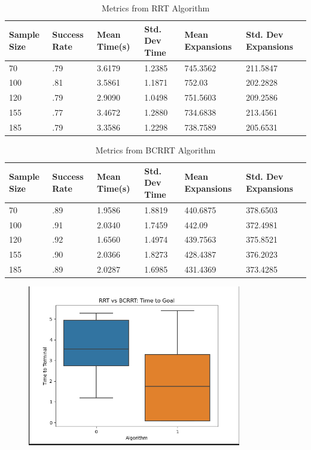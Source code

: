 \documentclass{article}
\begin{document}

\begin{table}
  \caption{Metrics from RRT Algorithm}
  \label{RRT Metrics}
  \centering
  \begin{tabular}{llllll}
    \cmidrule(r){1-6}
   Sample Size    & Success Rate     & Mean Time(s) & Std. Dev Time & Mean Expansions & Std. Dev Expansions\\
    \midrule
    70 & .79 & 3.6179 & 1.2385 & 745.3562 & 211.5847 \\
    100 & .81 & 3.5861 & 1.1871 & 752.03 & 202.2828 \\
    120 & .79 & 2.9090 & 1.0498 & 751.5603 & 209.2586 \\
    155 & .77 & 3.4672 & 1.2880 & 734.6838 & 213.4561 \\
    185 & .79 & 3.3586 & 1.2298 & 738.7589 & 205.6531 \\
    \bottomrule
  \end{tabular}
\end{table}


\begin{table}
  \caption{Metrics from BCRRT Algorithm}
  \label{BCRRT Metrics}
  \centering
  \begin{tabular}{llllll}
    \cmidrule(r){1-6}
   Sample Size    & Success Rate     & Mean Time(s) & Std. Dev Time & Mean Expansions & Std. Dev Expansions\\
    \midrule
    70 & .89 & 1.9586 & 1.8819 & 440.6875 & 378.6503 \\
    100 & .91 & 2.0340 & 1.7459 & 442.09 & 372.4981 \\
    120 & .92 & 1.6560 & 1.4974 & 439.7563 & 375.8521 \\
    155 & .90 & 2.0366 & 1.8273 & 428.4387 & 376.2023 \\
    185 & .89 & 2.0287 & 1.6985 & 431.4369 & 373.4285 \\
    \bottomrule
  \end{tabular}
\end{table}

\begin{figure}[htbp]
	\centerline{\includegraphics{BoxWhiskerTime.png}}
\end{figure}
\end{document}

